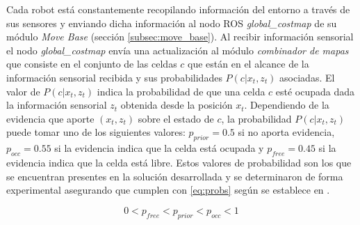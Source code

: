 Cada robot está constantemente recopilando información del entorno a través de
sus sensores y enviando dicha información al nodo \gls{ROS}
\emph{global\_costmap} de su módulo \emph{Move Base} (sección
\ref{subsec:move_base}). Al recibir información sensorial el nodo
\emph{global\_costmap} envía una actualización al módulo \emph{combinador de
mapas} que consiste en el conjunto de las celdas $c$ que están en el alcance de
la información sensorial recibida y sus probabilidades $P(c | x_t,z_t)$ asociadas. El
valor de $P(c|x_t,z_t)$ indica la probabilidad de que una celda
$c$ esté ocupada dada la información sensorial $z_t$ obtenida desde la posición
$x_t$. Dependiendo de la evidencia que aporte $(x_t,z_t)$ sobre el estado de
$c$, la probabilidad $P(c|x_t,z_t)$ puede tomar uno de los siguientes
valores: $p_{prior} = 0.5$ si no aporta evidencia, $p_{occ} = 0.55$ si la
evidencia indica que la celda está ocupada y $p_{free} = 0.45$ si la evidencia
indica que la celda está libre. Estos valores de probabilidad son los que se
encuentran presentes en la solución desarrollada y se determinaron de forma
experimental asegurando que cumplen con \eqref{eq:probs} según se establece en
\cite{stachniss2009robotic}.

\begin{equation}\label{eq:probs}
  0 < p_{free} < p_{prior} < p_{occ} < 1
\end{equation}


